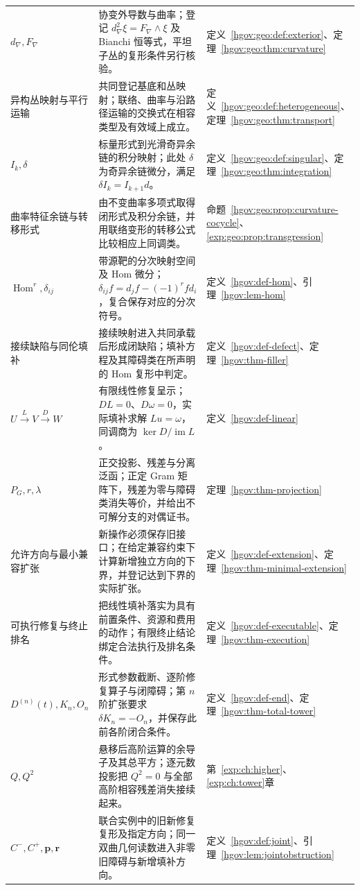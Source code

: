 \documentclass[12pt,a4paper,openany,notitlepage]{report}
\theoremstyle{plain}
\theoremstyle{definition}
\theoremstyle{remark}
\begin{document}
\begin{CJK*}{UTF8}{gkai}
\begin{longtable}{P{0.24\textwidth}P{0.54\textwidth}P{0.14\textwidth}}
$d_\nabla,F_\nabla$ & 协变外导数与曲率；登记 $d_\nabla^2\xi=F_\nabla\wedge\xi$ 及 Bianchi 恒等式，平坦子丛的复形条件另行核验。 & 定义~\ref{hgov:geo:def:exterior}、定理~\ref{hgov:geo:thm:curvature}\\
异构丛映射与平行运输 & 共同登记基底和丛映射；联络、曲率与沿路径运输的交换式在相容类型及有效域上成立。 & 定义~\ref{hgov:geo:def:heterogeneous}、定理~\ref{hgov:geo:thm:transport}\\
$I_k,\delta$ & 标量形式到光滑奇异余链的积分映射；此处 $\delta$ 为奇异余链微分，满足 $\delta I_k=I_{k+1}d$。 & 定义~\ref{hgov:geo:def:singular}、定理~\ref{hgov:geo:thm:integration}\\
曲率特征余链与转移形式 & 由不变曲率多项式取得闭形式及积分余链，并用联络变形的转移公式比较相应上同调类。 & 命题~\ref{hgov:geo:prop:curvature-cocycle}、\ref{exp:geo:prop:transgression}\\
$\operatorname{Hom}^r,\delta_{ij}$ & 带源靶的分次映射空间及 Hom 微分；$\delta_{ij}f=d_jf-(-1)^rfd_i$，复合保存对应的分次符号。 & 定义~\ref{hgov:def-hom}、引理~\ref{hgov:lem-hom}\\
接续缺陷与同伦填补 & 接续映射进入共同承载后形成闭缺陷；填补方程及其障碍类在所声明的 Hom 复形中判定。 & 定义~\ref{hgov:def-defect}、定理~\ref{hgov:thm-filler}\\
$U\xrightarrow{L}V\xrightarrow{D}W$ & 有限线性修复呈示；$DL=0$、$D\omega=0$，实际填补求解 $Lu=\omega$，同调商为 $\ker D/\operatorname{im}L$。 & 定义~\ref{hgov:def-linear}\\
$P_G,r,\lambda$ & 正交投影、残差与分离泛函；正定 Gram 矩阵下，残差为零与障碍类消失等价，并给出不可解分支的对偶证书。 & 定理~\ref{hgov:thm-projection}\\
允许方向与最小兼容扩张 & 新操作必须保存旧接口；在给定兼容约束下计算新增独立方向的下界，并登记达到下界的实际扩张。 & 定义~\ref{hgov:def-extension}、定理~\ref{hgov:thm-minimal-extension}\\
可执行修复与终止排名 & 把线性填补落实为具有前置条件、资源和费用的动作；有限终止结论绑定合法执行及排名条件。 & 定义~\ref{hgov:def-executable}、定理~\ref{hgov:thm-execution}\\
$D^{(n)}(t),K_n,O_n$ & 形式参数截断、逐阶修复算子与闭障碍；第 $n$ 阶扩张要求 $\delta K_n=-O_n$，并保存此前各阶闭合条件。 & 定义~\ref{hgov:def-end}、定理~\ref{hgov:thm-total-tower}\\
$Q,Q^2$ & 悬移后高阶运算的余导子及其总平方；逐元数投影把 $Q^2=0$ 与全部高阶相容残差消失接续起来。 & 第~\ref{exp:ch:higher}、\ref{exp:ch:tower}章\\
$C^-,C^+,\mathbf p,\mathbf r$ & 联合实例中的旧新修复复形及指定方向；同一双曲几何读数进入非零旧障碍与新增填补方向。 & 定义~\ref{hgov:def:joint}、引理~\ref{hgov:lem:jointobstruction}\\

\end{longtable}
\end{CJK*}
\end{document}
